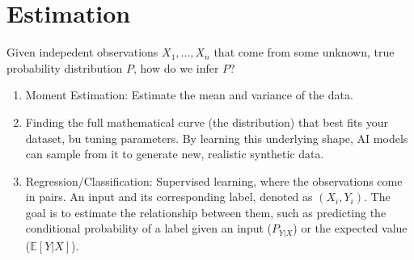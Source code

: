 \documentclass[../Probability.tex]{subfiles}
\begin{document}
\section{Estimation}
Given indepedent observations $X_1, \ldots, X_n$ that come from some unknown, true probability distribution $P$, how do we infer $P$?
\begin{enumerate}
    \item Moment Estimation: Estimate the mean and variance of the data.
    \item Finding the full mathematical curve (the distribution) that best fits your dataset, bu tuning parameters. By learning this underlying shape, AI models can sample from it to generate new, realistic synthetic data.
    \item Regression/Classification: Supervised learning, where the observations come in pairs. An input and its corresponding label, denoted as $(X_{i}, Y_{i})$. The goal is to estimate the relationship between them, such as predicting the conditional probability of a label given an input ($P_{Y|X}$) or the expected value ($\mathbb{E}[Y|X]$).
\end{enumerate}
\end{document}
